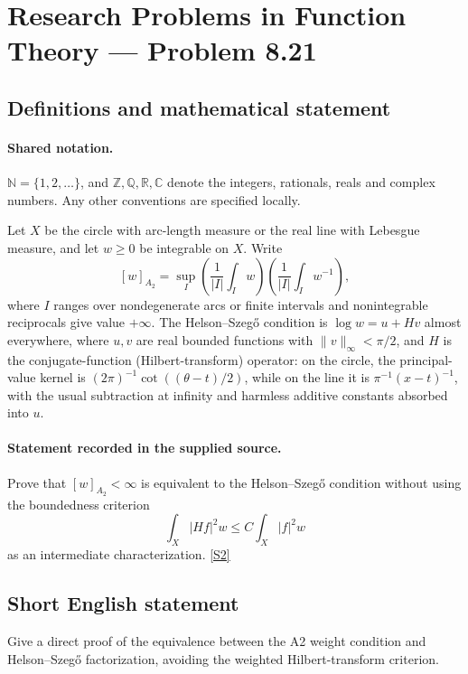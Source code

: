 \documentclass[11pt]{book}
\newcommand{\sref}[2]{\hyperlink{source:#1:#2}{[S#2]}}
\begin{document}
\section{Research Problems in Function Theory — Problem 8.21}\label{statement}

\subsection{Definitions and mathematical statement}

\paragraph{Shared notation.}$\mathbb N=\{1,2,\ldots\}$, and $\mathbb Z,\mathbb Q,\mathbb R,\mathbb C$ denote the integers, rationals, reals and complex numbers. Any other conventions are specified locally.


Let $X$ be the circle with arc-length measure or the real line with Lebesgue measure, and let $w\ge0$ be integrable on $X$. Write \[[w]_{A_2}=\sup_I\left(\frac1{|I|}\int_Iw\right)\left(\frac1{|I|}\int_Iw^{-1}\right),\] where $I$ ranges over nondegenerate arcs or finite intervals and nonintegrable reciprocals give value $+\infty$. The Helson--Szeg\H{o} condition is $\log w=u+Hv$ almost everywhere, where $u,v$ are real bounded functions with $\|v\|_\infty<\pi/2$, and $H$ is the conjugate-function (Hilbert-transform) operator: on the circle, the principal-value kernel is $(2\pi)^{-1}\cot((\theta-t)/2)$, while on the line it is $\pi^{-1}(x-t)^{-1}$, with the usual subtraction at infinity and harmless additive constants absorbed into $u$.
\paragraph{Statement recorded in the supplied source.}
Prove that $[w]_{A_2}<\infty$ is equivalent to the Helson--Szeg\H{o} condition without using the boundedness criterion \[\int_X|Hf|^2w\le C\int_X|f|^2w\] as an intermediate characterization. \sref{statement}{2}
\subsection{Short English statement}
Give a direct proof of the equivalence between the A2 weight condition and Helson–Szegő factorization, avoiding the weighted Hilbert-transform criterion.
\end{document}
